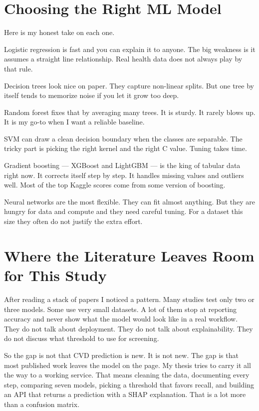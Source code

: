 \documentclass[12pt, a4paper, oneside]{book}
\begin{document}
\section{Choosing the Right ML Model}
Here is my honest take on each one.

Logistic regression is fast and you can explain it to anyone. The big weakness is it assumes a straight line relationship. Real health data does not always play by that rule.

Decision trees look nice on paper. They capture non-linear splits. But one tree by itself tends to memorize noise if you let it grow too deep.

Random forest fixes that by averaging many trees. It is sturdy. It rarely blows up. It is my go-to when I want a reliable baseline.

SVM can draw a clean decision boundary when the classes are separable. The tricky part is picking the right kernel and the right C value. Tuning takes time.

Gradient boosting — XGBoost and LightGBM — is the king of tabular data right now. It corrects itself step by step. It handles missing values and outliers well. Most of the top Kaggle scores come from some version of boosting.

Neural networks are the most flexible. They can fit almost anything. But they are hungry for data and compute and they need careful tuning. For a dataset this size they often do not justify the extra effort.

\section{Where the Literature Leaves Room for This Study}
After reading a stack of papers I noticed a pattern. Many studies test only two or three models. Some use very small datasets. A lot of them stop at reporting accuracy and never show what the model would look like in a real workflow. They do not talk about deployment. They do not talk about explainability. They do not discuss what threshold to use for screening.

So the gap is not that CVD prediction is new. It is not new. The gap is that most published work leaves the model on the page. My thesis tries to carry it all the way to a working service. That means cleaning the data, documenting every step, comparing seven models, picking a threshold that favors recall, and building an API that returns a prediction with a SHAP explanation. That is a lot more than a confusion matrix.
\end{document}
